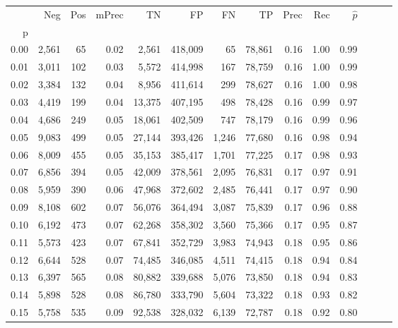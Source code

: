 \begin{tabular}{rrrrrrrrrrrrrr}
\toprule
{} &     Neg &    Pos & mPrec &       TN &       FP &      FN &      TP &  Prec &   Rec & $\hat{p}$ \\
p    &         &        &       &          &          &         &         &       &       &           \\
\midrule
0.00 &   2,561 &     65 &  0.02 &    2,561 &  418,009 &      65 &  78,861 &  0.16 &  1.00 &      0.99 \\
0.01 &   3,011 &    102 &  0.03 &    5,572 &  414,998 &     167 &  78,759 &  0.16 &  1.00 &      0.99 \\
0.02 &   3,384 &    132 &  0.04 &    8,956 &  411,614 &     299 &  78,627 &  0.16 &  1.00 &      0.98 \\
0.03 &   4,419 &    199 &  0.04 &   13,375 &  407,195 &     498 &  78,428 &  0.16 &  0.99 &      0.97 \\
0.04 &   4,686 &    249 &  0.05 &   18,061 &  402,509 &     747 &  78,179 &  0.16 &  0.99 &      0.96 \\
0.05 &   9,083 &    499 &  0.05 &   27,144 &  393,426 &   1,246 &  77,680 &  0.16 &  0.98 &      0.94 \\
0.06 &   8,009 &    455 &  0.05 &   35,153 &  385,417 &   1,701 &  77,225 &  0.17 &  0.98 &      0.93 \\
0.07 &   6,856 &    394 &  0.05 &   42,009 &  378,561 &   2,095 &  76,831 &  0.17 &  0.97 &      0.91 \\
0.08 &   5,959 &    390 &  0.06 &   47,968 &  372,602 &   2,485 &  76,441 &  0.17 &  0.97 &      0.90 \\
0.09 &   8,108 &    602 &  0.07 &   56,076 &  364,494 &   3,087 &  75,839 &  0.17 &  0.96 &      0.88 \\
0.10 &   6,192 &    473 &  0.07 &   62,268 &  358,302 &   3,560 &  75,366 &  0.17 &  0.95 &      0.87 \\
0.11 &   5,573 &    423 &  0.07 &   67,841 &  352,729 &   3,983 &  74,943 &  0.18 &  0.95 &      0.86 \\
0.12 &   6,644 &    528 &  0.07 &   74,485 &  346,085 &   4,511 &  74,415 &  0.18 &  0.94 &      0.84 \\
0.13 &   6,397 &    565 &  0.08 &   80,882 &  339,688 &   5,076 &  73,850 &  0.18 &  0.94 &      0.83 \\
0.14 &   5,898 &    528 &  0.08 &   86,780 &  333,790 &   5,604 &  73,322 &  0.18 &  0.93 &      0.82 \\
0.15 &   5,758 &    535 &  0.09 &   92,538 &  328,032 &   6,139 &  72,787 &  0.18 &  0.92 &      0.80 \\

\end{tabular}
